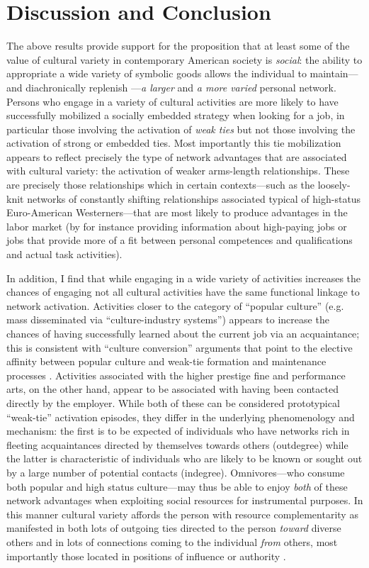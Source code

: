 \section{Discussion and Conclusion}
The above results provide support for the proposition that at least some of the value of cultural variety in contemporary American society is \emph{social}: the ability to appropriate a wide variety of symbolic goods allows the individual to maintain---and diachronically replenish \citep{cardon_granjon05, lazarsfeld_merton54}---\emph{a larger} and \emph{a more varied} personal network.   Persons who engage in a variety of cultural activities are more likely to have successfully mobilized a socially embedded strategy when looking for a job, in particular those involving the activation of \emph{weak ties} but not those involving the activation of strong or embedded ties.  Most importantly this tie mobilization appears to reflect precisely the type of network advantages that are associated with cultural variety: the activation of weaker arms-length relationships. These are precisely those relationships which in certain contexts---such as the loosely-knit networks of constantly shifting relationships associated typical of high-status Euro-American Westerners---that are most likely to produce advantages in the labor market (by for instance providing information about high-paying jobs or jobs that provide more of a fit between personal competences and qualifications and actual task activities). 

In addition, I find that while engaging in a wide variety of activities increases the chances of engaging not all cultural activities have the same functional linkage to network activation. Activities closer to the category of ``popular culture'' (e.g. mass disseminated via ``culture-industry systems'') appears to increase the chances of having successfully learned about the current job via an acquaintance; this is consistent with ``culture conversion'' arguments that point to the elective affinity between popular culture and weak-tie formation and maintenance processes \citep{lizardo06a}.  Activities associated with the higher prestige fine and performance arts, on the other hand, appear to be associated with having been contacted directly by the employer. While both of these can be considered prototypical ``weak-tie'' activation episodes, they differ in the underlying phenomenology and mechanism:  the first is to be expected of individuals who have networks rich in fleeting acquaintances directed by themselves towards others (outdegree) while the latter is characteristic of individuals who are likely to be known or sought out by a large number of potential contacts (indegree). Omnivores---who consume both popular and high status culture---may thus be able to enjoy \emph{both} of these network advantages when exploiting social resources for instrumental purposes. In this manner cultural variety affords the person with resource complementarity as manifested in both lots of outgoing ties directed to the person \emph{toward} diverse others and in lots of connections coming to the individual \emph{from} others, most importantly those located in positions of influence or authority \citep{yakubovich05, bian97, podolny_baron97}.

